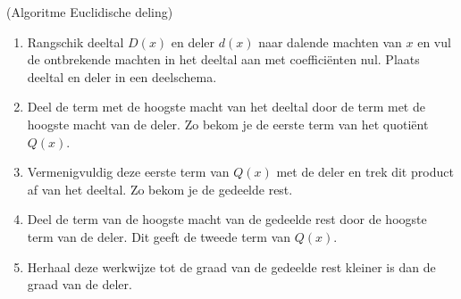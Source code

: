 \documentclass{ximera}
\begin{document}
\begin{proposition} (Algoritme Euclidische deling)

\begin{enumerate}
\item Rangschik deeltal $D(x)$ en deler $d(x)$ naar dalende machten van $x$ en vul de ontbre\-kende machten in het deeltal aan met coeffici\"{e}nten nul. 
Plaats deeltal en deler in een deelschema.
\item Deel de term met de hoogste macht van het deeltal door de term met de hoogste macht van de deler. 
Zo bekom je de eerste term van het quoti\"{e}nt $Q(x)$.
\item Vermenigvuldig deze eerste term van $Q(x)$ met de deler en trek dit product af van het deeltal. 
Zo bekom je de gedeelde rest.
\item Deel de term van de hoogste macht van de gedeelde rest door de hoogste term van de deler. 
Dit geeft de tweede term van $Q(x)$.
\item Herhaal deze werkwijze tot de graad van de gedeelde rest kleiner is dan de graad van de deler.
\end{enumerate}
\end{proposition}
\end{document}
